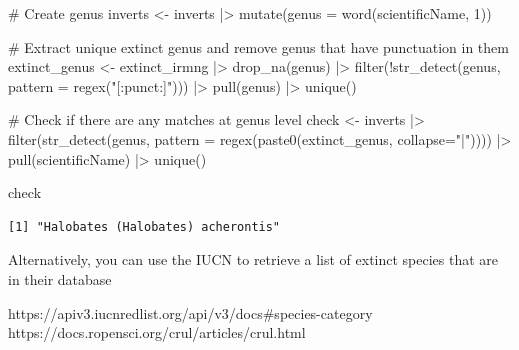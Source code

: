 \documentclass[
  letterpaper,
  DIV=11,
  numbers=noendperiod,
  oneside]{scrreprt}
\newenvironment{Shaded}{\begin{snugshade}}{\end{snugshade}}
\newcommand{\AttributeTok}[1]{\textcolor[rgb]{0.40,0.45,0.13}{#1}}
\newcommand{\CommentTok}[1]{\textcolor[rgb]{0.37,0.37,0.37}{#1}}
\newcommand{\DecValTok}[1]{\textcolor[rgb]{0.68,0.00,0.00}{#1}}
\newcommand{\FunctionTok}[1]{\textcolor[rgb]{0.28,0.35,0.67}{#1}}
\newcommand{\NormalTok}[1]{\textcolor[rgb]{0.00,0.23,0.31}{#1}}
\newcommand{\OtherTok}[1]{\textcolor[rgb]{0.00,0.23,0.31}{#1}}
\newcommand{\SpecialCharTok}[1]{\textcolor[rgb]{0.37,0.37,0.37}{#1}}
\newcommand{\StringTok}[1]{\textcolor[rgb]{0.13,0.47,0.30}{#1}}
\begin{document}
\begin{Shaded}
\begin{Highlighting}[]
\CommentTok{\# Create genus }
\NormalTok{inverts }\OtherTok{\textless{}{-}}\NormalTok{ inverts }\SpecialCharTok{|\textgreater{}} 
  \FunctionTok{mutate}\NormalTok{(}\AttributeTok{genus =} \FunctionTok{word}\NormalTok{(scientificName, }\DecValTok{1}\NormalTok{)) }

\CommentTok{\# Extract unique extinct genus and remove genus that have punctuation in them}
\NormalTok{extinct\_genus }\OtherTok{\textless{}{-}}\NormalTok{ extinct\_irmng }\SpecialCharTok{|\textgreater{}} 
  \FunctionTok{drop\_na}\NormalTok{(genus) }\SpecialCharTok{|\textgreater{}} 
  \FunctionTok{filter}\NormalTok{(}\SpecialCharTok{!}\FunctionTok{str\_detect}\NormalTok{(genus, }\AttributeTok{pattern =} \FunctionTok{regex}\NormalTok{(}\StringTok{"[:punct:]"}\NormalTok{))) }\SpecialCharTok{|\textgreater{}} 
  \FunctionTok{pull}\NormalTok{(genus) }\SpecialCharTok{|\textgreater{}} 
  \FunctionTok{unique}\NormalTok{() }
 
\CommentTok{\# Check if there are any matches at genus level}
\NormalTok{check }\OtherTok{\textless{}{-}}\NormalTok{ inverts }\SpecialCharTok{|\textgreater{}} 
\FunctionTok{filter}\NormalTok{(}\FunctionTok{str\_detect}\NormalTok{(genus, }\AttributeTok{pattern =} \FunctionTok{regex}\NormalTok{(}\FunctionTok{paste0}\NormalTok{(extinct\_genus, }\AttributeTok{collapse=}\StringTok{"|"}\NormalTok{)))) }\SpecialCharTok{|\textgreater{}} 
  \FunctionTok{pull}\NormalTok{(scientificName) }\SpecialCharTok{|\textgreater{}} 
  \FunctionTok{unique}\NormalTok{() }

\NormalTok{check}
\end{Highlighting}
\end{Shaded}

\begin{verbatim}
[1] "Halobates (Halobates) acherontis"
\end{verbatim}

Alternatively, you can use the IUCN to retrieve a list of extinct
species that are in their database

https://apiv3.iucnredlist.org/api/v3/docs\#species-category
https://docs.ropensci.org/crul/articles/crul.html
\end{document}
